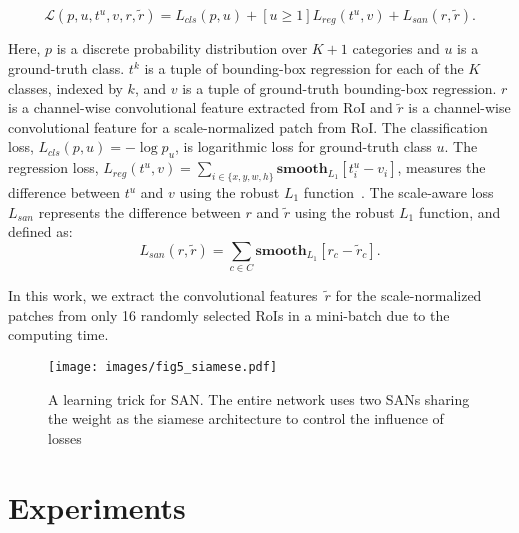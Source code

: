 \documentclass[runningheads]{llncs}
\begin{document}
\begin{equation}
\mathcal{L}(p,u,t^u,v,r,\widetilde{r}) = 
L_{cls} (p,u) 
+ [u \geq 1] L_{reg}(t^u,v)
+ L_{san}(r,\widetilde{r}).
\end{equation}

Here, $p$ is a discrete probability distribution over $K+1$ categories and $u$ is a ground-truth class.
$t^k$ is a tuple of bounding-box regression for each of the $K$ classes, indexed by $k$, and $v$ is a tuple of ground-truth bounding-box regression.
$r$ is a channel-wise convolutional feature extracted from RoI and $\widetilde{r}$ is a channel-wise convolutional feature for a scale-normalized patch from RoI.
The classification loss,
$L_{cls} (p,u)=-\log p_u$,
is logarithmic loss for ground-truth class $u$.
The regression loss,
$L_{reg}(t^u,v)=\sum _{i \in \{ x,y,w,h \} } {\mathbf{smooth}_{L_1}} \left[ t_i^u-v_i \right]$,
measures the difference between $t^u$ and $v$ using the robust $L_1$ function~\cite{girshick2015fast}.
The scale-aware loss $L_{san}$ represents the difference between $r$ and $\widetilde{r}$ using the robust $L_1$ function, and defined as: 
\begin{equation}
L_{san}(r,\widetilde{r}) = \sum _ {c \in C} {\mathbf{smooth}_{L_1}} \left[ r_c-\widetilde{r}_c \right].
\end{equation}

In this work, we extract the convolutional features~$\widetilde{r}$ for the scale-normalized patches from only 16 randomly selected RoIs in a mini-batch due to the computing time.

\begin{figure}[t]
	\texttt{[image: images/fig5\_siamese.pdf]}
	\caption{A learning trick for SAN.
		The entire network uses two SANs sharing the weight as the siamese architecture to control the influence of losses
	}
	\centering
	\label{fig:SIAMESE}
\end{figure}

\section{Experiments}
\end{document}
